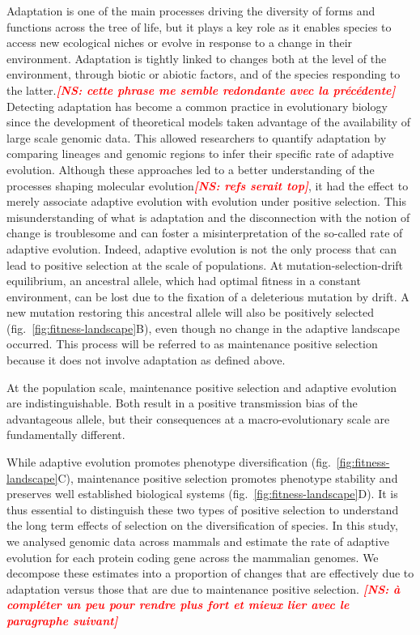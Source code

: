 \documentclass{article}
\newcommand{\NS}[1]{\textcolor{red}{\textbf{\emph{[NS: #1]}}}}
\begin{document}
    Adaptation is one of the main processes driving the diversity of forms and functions across the tree of life\cite{darwin_origin_1859}, but it plays a key role as it enables species to access new ecological niches or evolve in response to a change in their environment\cite{darwin_origin_1859, merrell_adaptive_1994}.
    Adaptation is tightly linked to changes both at the level of the environment, through biotic or abiotic factors, and of the species responding to the latter\cite{merrell_adaptive_1994}.\NS{cette phrase me semble redondante avec la précédente}
    Detecting adaptation has become a common practice in evolutionary biology since the development of theoretical models taken advantage of the availability of large scale genomic data\cite{mcdonald_adaptative_1991, eyre-walker_distribution_2006}.
    This allowed researchers to quantify adaptation by comparing lineages and genomic regions to infer their specific rate of adaptive evolution\cite{mcdonald_adaptative_1991, eyre-walker_distribution_2006, galtier_adaptive_2016}.
    Although these approaches led to a better understanding of the processes shaping molecular evolution\NS{refs serait top}, it had the effect to merely associate adaptive evolution with evolution under positive selection\cite{eyre-walker_distribution_2006}.
    This misunderstanding of what is adaptation and the disconnection with the notion of change is troublesome and can foster a misinterpretation of the so-called rate of adaptive evolution.
    Indeed, adaptive evolution is not the only process that can lead to positive selection at the scale of populations\cite{sella_application_2005, mustonen_fitness_2009}.
    At mutation-selection-drift equilibrium, an ancestral allele, which had optimal fitness in a constant environment, can be lost due to the fixation of a deleterious mutation by drift.
    A new mutation restoring this ancestral allele will also be positively selected (fig.~\ref{fig:fitness-landscape}B), even though no change in the adaptive landscape occurred.
    This process will be referred to as maintenance positive selection because it does not involve adaptation as defined above.

    At the population scale, maintenance positive selection and adaptive evolution are indistinguishable.
    Both result in a positive transmission bias of the advantageous allele, but their consequences at a macro-evolutionary scale are fundamentally different.

    While adaptive evolution promotes phenotype diversification (fig.~\ref{fig:fitness-landscape}C), maintenance positive selection promotes phenotype stability and preserves well established biological systems (fig.~\ref{fig:fitness-landscape}D).
    It is thus essential to distinguish these two types of positive selection to understand the long term effects of selection on the diversification of species.
    In this study, we analysed genomic data across mammals and estimate the rate of adaptive evolution for each protein coding gene across the mammalian genomes.
    We decompose these estimates into a proportion of changes that are effectively due to adaptation versus those that are due to maintenance positive selection. \NS{à compléter un peu pour rendre plus fort et mieux lier avec le paragraphe suivant}
\end{document}
